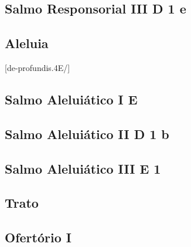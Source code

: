 \subsection[Salmo Responsorial III]{Salmo Responsorial III \textmd{D 1 e}}\label{subsection:liturgia-defunctorum/missa-pro-defunctis/psalmus-responsorius-3}

\subsection{Aleluia}\label{subsection:liturgia-defunctorum/missa-pro-defunctis/alleluia}
[de-profundis.4E/]

\subsection[Salmo Aleluiático I]{Salmo Aleluiático I \textmd{E \protect\GreStar}}\label{subsection:liturgia-defunctorum/missa-pro-defunctis/psalmus-alleluiaticus-1}

\AllowPageFlush

\subsection[Salmo Aleluiático II]{Salmo Aleluiático II \textmd{D 1 b}}\label{subsection:liturgia-defunctorum/missa-pro-defunctis/psalmus-alleluiaticus-2}

\AllowPageFlush

\subsection[Salmo Aleluiático III]{Salmo Aleluiático III \textmd{E 1}}\label{subsection:liturgia-defunctorum/missa-pro-defunctis/psalmus-alleluiaticus-3}

\subsection{Trato}\label{subsection:liturgia-defunctorum/missa-pro-defunctis/tractus}

\subsection{Ofertório I}\label{subsection:liturgia-defunctorum/missa-pro-defunctis/offertorium-1}

